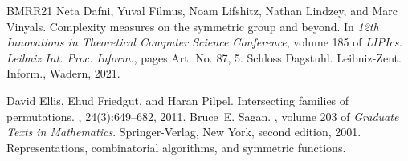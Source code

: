 \documentclass[10pt,a4paper]{article}
\theoremstyle{definition}
\begin{document}
\newcommand{\etalchar}[1]{$^{#1}$}
\begin{thebibliography}{BMRR21}
\bibitem[DFL{\etalchar{+}}21]{DFLLV}
Neta Dafni, Yuval Filmus, Noam Lifshitz, Nathan Lindzey, and Marc Vinyals.
\newblock Complexity measures on the symmetric group and beyond.
\newblock In {\em 12th {I}nnovations in {T}heoretical {C}omputer {S}cience
  {C}onference}, volume 185 of {\em LIPIcs. Leibniz Int. Proc. Inform.}, pages
  Art. No. 87, 5. Schloss Dagstuhl. Leibniz-Zent. Inform., Wadern, 2021.

David Ellis, Ehud Friedgut, and Haran Pilpel.
\newblock Intersecting families of permutations.
, 24(3):649--682, 2011.
Bruce~E. Sagan.
, volume 203 of {\em Graduate Texts in
  Mathematics}.
\newblock Springer-Verlag, New York, second edition, 2001.
\newblock Representations, combinatorial algorithms, and symmetric functions.
\end{thebibliography}
\end{document}
